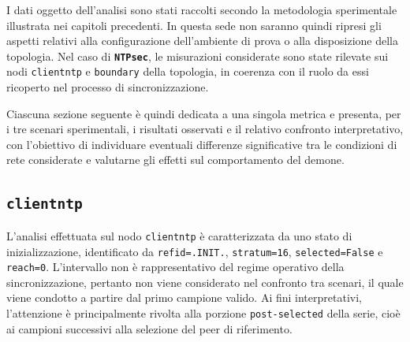 I dati oggetto dell'analisi sono stati raccolti secondo la metodologia sperimentale
illustrata nei capitoli precedenti. In questa sede non saranno quindi ripresi
gli aspetti relativi alla configurazione dell'ambiente di prova o alla
disposizione della topologia. Nel caso di \texttt{\textbf{NTPsec}}, le misurazioni
considerate sono state rilevate sui nodi \texttt{clientntp} e \texttt{boundary} della
topologia, in coerenza con il ruolo da essi ricoperto nel processo di
sincronizzazione.

Ciascuna sezione seguente è quindi dedicata a una singola metrica e presenta, per
i tre scenari sperimentali, i risultati osservati e il relativo confronto
interpretativo, con l'obiettivo di individuare eventuali differenze significative
tra le condizioni di rete considerate e valutarne gli effetti sul comportamento del
demone.

\subsection{\texttt{clientntp}}
\begin{sloppypar}
  L'analisi effettuata sul nodo \texttt{clientntp} è caratterizzata da uno stato
  di inizializzazione, identificato da \texttt{refid=.INIT.}, \texttt{stratum=16}, \texttt{selected=False}
  e \texttt{reach=0}. L'intervallo non è rappresentativo del regime operativo
  della sincronizzazione, pertanto non viene considerato nel confronto tra scenari,
  il quale viene condotto a partire dal primo campione valido. Ai fini interpretativi,
  l'attenzione è principalmente rivolta alla porzione \texttt{post-selected} della serie,
  cioè ai campioni successivi alla selezione del peer di riferimento.
\end{sloppypar}
